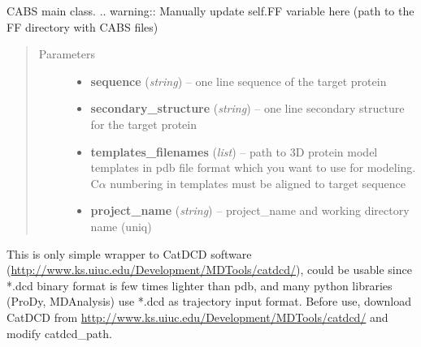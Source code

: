 \documentclass[letterpaper,10pt,english]{sphinxmanual}
\begin{document}
\begin{fulllineitems}
\label{api:pycabs.CABS}
CABS main class.
.. warning:: 
Manually update self.FF variable here (path to the FF directory with CABS files)
\begin{quote}\begin{description}
\item[{Parameters}] \leavevmode\begin{itemize}
\item {} 
\textbf{sequence} (\emph{string}) -- one line sequence of the target protein

\item {} 
\textbf{secondary\_structure} (\emph{string}) -- one line secondary structure for the target protein

\item {} 
\textbf{templates\_filenames} (\emph{list}) -- path to 3D protein model templates in pdb file format which you want to use for modeling. C\(\alpha\) numbering in templates must be aligned to target sequence

\item {} 
\textbf{project\_name} (\emph{string}) -- project\_name and working directory name (uniq)

\end{itemize}

\end{description}\end{quote}

\begin{fulllineitems}
\label{api:pycabs.CABS.convertPdbToDcd}
This is only simple wrapper to CatDCD software (\href{http://www.ks.uiuc.edu/Development/MDTools/catdcd/}{http://www.ks.uiuc.edu/Development/MDTools/catdcd/}), 
could be usable since *.dcd binary format is few times lighter than pdb, and many python libraries 
(ProDy, MDAnalysis) use *.dcd as trajectory input format.
Before use, download CatDCD from \href{http://www.ks.uiuc.edu/Development/MDTools/catdcd/}{http://www.ks.uiuc.edu/Development/MDTools/catdcd/} and modify catdcd\_path.

\end{fulllineitems}



\end{fulllineitems}
\end{document}
